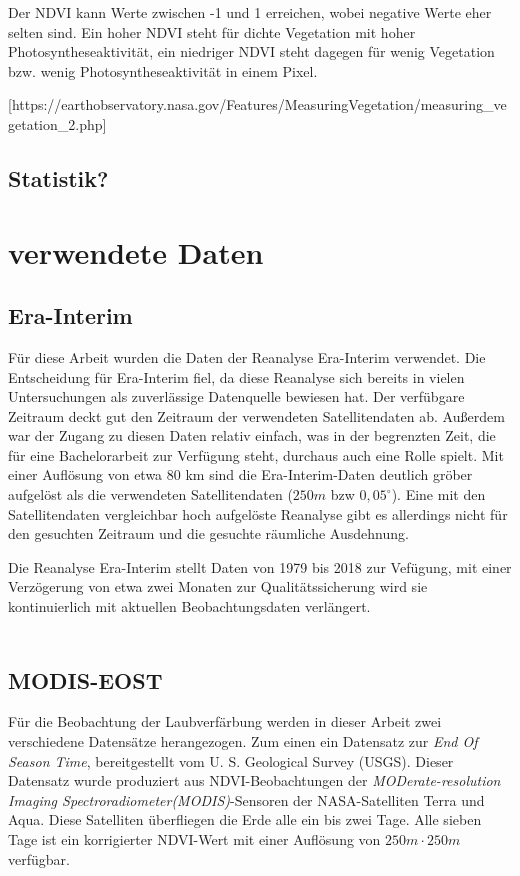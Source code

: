 \documentclass[]{article}
\begin{document}
Der NDVI kann Werte zwischen -1 und 1 erreichen, wobei negative Werte eher selten sind. Ein hoher NDVI steht für dichte Vegetation mit hoher Photosyntheseaktivität, ein niedriger NDVI steht dagegen für wenig Vegetation bzw. wenig Photosyntheseaktivität in einem Pixel.

[https://earthobservatory.nasa.gov/Features/MeasuringVegetation/measuring\_vegetation\_2.php]
\subsection{Statistik?}
\section{verwendete Daten}
\subsection{Era-Interim}
Für diese Arbeit wurden die Daten der Reanalyse Era-Interim verwendet. Die Entscheidung für Era-Interim fiel, da diese Reanalyse sich bereits in vielen Untersuchungen als zuverlässige Datenquelle bewiesen hat. Der verfübgare Zeitraum deckt gut den Zeitraum der verwendeten Satellitendaten ab. Außerdem war der Zugang zu diesen Daten relativ einfach, was in der begrenzten Zeit, die für eine Bachelorarbeit zur Verfügung steht, durchaus auch eine Rolle spielt. Mit einer Auflösung von etwa 80 km sind die Era-Interim-Daten deutlich gröber aufgelöst als die verwendeten Satellitendaten ($250m$ bzw $0,05^{\circ}$). Eine mit den Satellitendaten vergleichbar hoch aufgelöste Reanalyse gibt es allerdings nicht für den gesuchten Zeitraum und die gesuchte räumliche Ausdehnung.

Die Reanalyse Era-Interim stellt Daten von 1979 bis 2018 zur Vefügung, mit einer Verzögerung von etwa zwei Monaten zur Qualitätssicherung wird sie kontinuierlich mit aktuellen Beobachtungsdaten verlängert.  
\\
\\

\subsection{MODIS-EOST}
Für die Beobachtung der Laubverfärbung werden in dieser Arbeit zwei verschiedene Datensätze herangezogen. Zum einen ein Datensatz zur \textit{End Of Season Time}, bereitgestellt vom U. S. Geological Survey (USGS). Dieser Datensatz wurde produziert aus NDVI-Beobachtungen der \textit{MODerate-resolution Imaging Spectroradiometer(MODIS)}-Sensoren der NASA-Satelliten Terra und Aqua. Diese Satelliten überfliegen die Erde alle ein bis zwei Tage. Alle sieben Tage ist ein korrigierter NDVI-Wert mit einer Auflösung von $250m \cdot 250m$ verfügbar.
\end{document}
